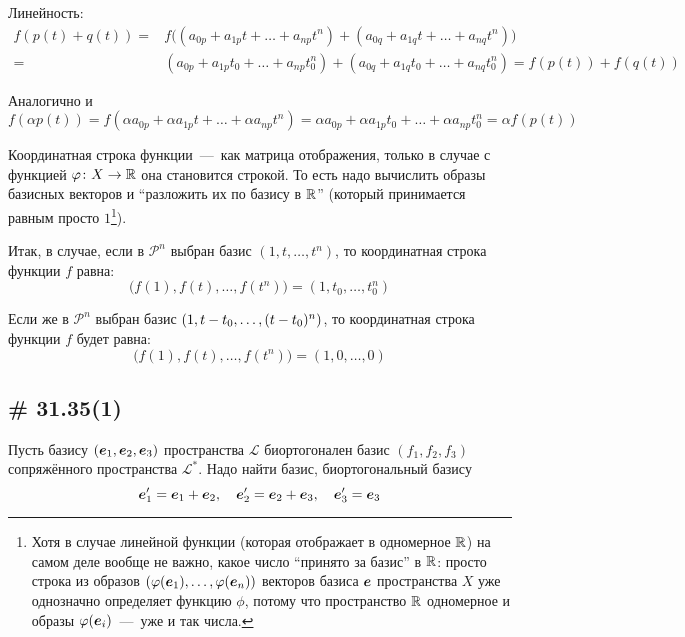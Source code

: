 \documentclass[a4paper,12pt]{article}
\begin{document}
  \begin{solution}
    Линейность:
    \begin{equation*}
    \begin{split}
      f(p(t) + q(t)) = &f\bigl((a_{0p} + a_{1p} t + \ldots + a_{np} t^n) + (a_{0q} + a_{1q} t + \ldots + a_{nq} t^n)\bigr)\\
      = &(a_{0p} + a_{1p} t_0 + \ldots + a_{np} t_0^n) + (a_{0q} + a_{1q} t_0 + \ldots + a_{nq} t_0^n)
      = f(p(t)) + f(q(t))
    \end{split}
    \end{equation*}
    
    Аналогично и
    \[
      f(\alpha p(t)) = f(\alpha a_{0p} + \alpha a_{1p} t + \ldots + \alpha a_{np} t^n)
      = \alpha a_{0p} + \alpha a_{1p} t_0 + \ldots + \alpha a_{np} t_0^n
      = \alpha f(p(t))
    \]
    
    Координатная строка функции~---~как матрица отображения, только в случае с функцией $\phi\colon X \hm\to \RR$ она становится строкой.
    То есть надо вычислить образы базисных векторов и ``разложить их по базису в $\operatorname{\mathbb R}$'' (который принимается равным просто $1$\footnote{Хотя в случае линейной функции (которая отображает в одномерное $\operatorname{\mathbb R}$) на самом деле вообще не важно, какое число ``принято за базис'' в $\operatorname{\mathbb R}$: просто строка из образов $(\varphi(\boldsymbol e_1), \ldots, \varphi(\boldsymbol e_n))$ векторов базиса $\boldsymbol e$ пространства $X$ уже однозначно определяет функцию $\phi$, потому что пространство $\operatorname{\mathbb R}$ одномерное и образы $\varphi(\boldsymbol e_i)$~---~уже и так числа.}).
    
    Итак, в случае, если в $\mathcal P^{n}$ выбран базис $(1, t, \ldots, t^n)$, то координатная строка функции $f$ равна:
    \[
      \bigl(f(1), f(t), \ldots, f(t^n)\bigr) = (1, t_0, \ldots, t_0^n)
    \]
    
    Если же в $\mathcal P^{n}$ выбран базис $(1, t \hm- t_0, \ldots, (t \hm- t_0)^n)$, то координатная строка функции $f$ будет равна:
    \[
      \bigl(f(1), f(t), \ldots, f(t^n)\bigr) = (1, 0, \ldots, 0)
    \]
  \end{solution}
  
  
  \subsection{\# 31.35(1)}
  
  Пусть базису $(\boldsymbol e_1, \boldsymbol e_2, \boldsymbol e_3)$ пространства $\mathcal L$ биортогонален базис $(f_1, f_2, f_3)$ сопряжённого пространства $\mathcal L^*$.
  Надо найти базис, биортогональный базису
  \[
    \boldsymbol e_1' = \boldsymbol e_1 + \boldsymbol e_2,
    \quad \boldsymbol e_2' = \boldsymbol e_2 + \boldsymbol e_3,
    \quad \boldsymbol e_3' = \boldsymbol e_3
  \]
  
\end{document}
